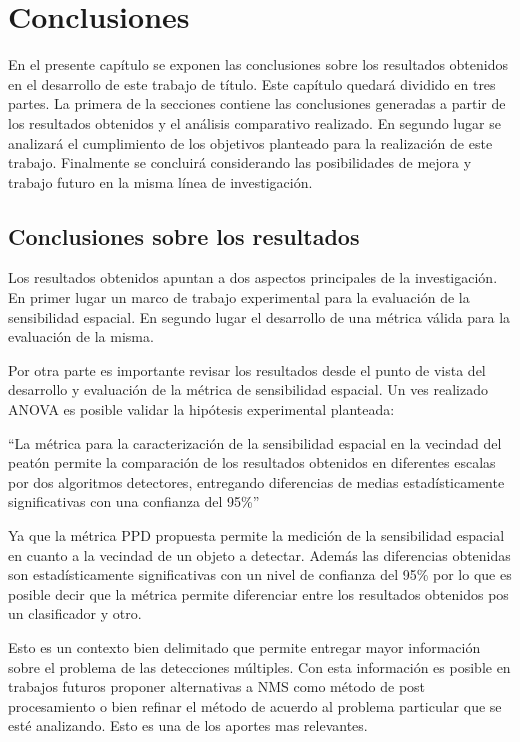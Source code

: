 
\chapter{Conclusiones}
\label{cap:conclusiones}

En el presente capítulo se exponen las conclusiones sobre los resultados obtenidos en el desarrollo de este trabajo de título. Este capítulo quedará dividido en tres partes. La primera de la secciones contiene las conclusiones generadas a partir de los resultados obtenidos y el análisis comparativo realizado. En segundo lugar se analizará el cumplimiento de los objetivos planteado para la realización de este trabajo. Finalmente se concluirá considerando las posibilidades de mejora y trabajo futuro en la misma línea de investigación.

\section{Conclusiones sobre los resultados}

Los resultados obtenidos apuntan a dos aspectos principales de la investigación. En primer lugar un marco de trabajo experimental para la evaluación de la sensibilidad espacial. En segundo lugar el desarrollo de una métrica válida para la evaluación de la misma. 

Por otra parte es importante revisar los resultados desde el punto de vista del desarrollo y evaluación de la métrica de sensibilidad espacial. Un ves realizado ANOVA es posible validar la hipótesis experimental planteada:

``La métrica para la caracterización de la sensibilidad espacial en la vecindad del peatón permite la comparación de los resultados obtenidos en diferentes escalas por dos algoritmos detectores, entregando diferencias de medias estadísticamente significativas con una confianza del 95\%''

Ya que la métrica PPD propuesta permite la medición de la sensibilidad espacial en cuanto a la vecindad de un objeto a detectar. Además las diferencias obtenidas son estadísticamente significativas con un nivel de confianza del 95\% por lo que es posible decir que la métrica permite diferenciar entre los resultados obtenidos pos un clasificador y otro.

Esto es un contexto bien delimitado que permite entregar mayor información sobre el problema de las detecciones múltiples. Con esta información es posible en trabajos futuros proponer alternativas a NMS como método de post procesamiento o bien refinar el método de acuerdo al problema particular que se esté analizando. Esto es una de los aportes mas relevantes. 

